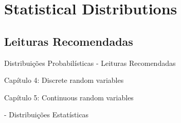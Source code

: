 \section{Statistical Distributions}

\subsection{Leituras Recomendadas}
\begin{frame}{Distribuições Probabilísticas - Leituras Recomendadas}
	\begin{vfilleditems}
		\item \textcite{dekkingModernIntroductionProbability2010}
		\begin{vfilleditems}
			\item Capítulo 4: Discrete random variables
			\item Capítulo 5: Continuous random variables
		\end{vfilleditems}
		\item \textcite{betancourtProbabilisticBuildingBlocks2019}
		\item \textcite{storopoli2021estatisticabayesianaR} - Distribuições Estatísticas
	\end{vfilleditems}
\end{frame}




